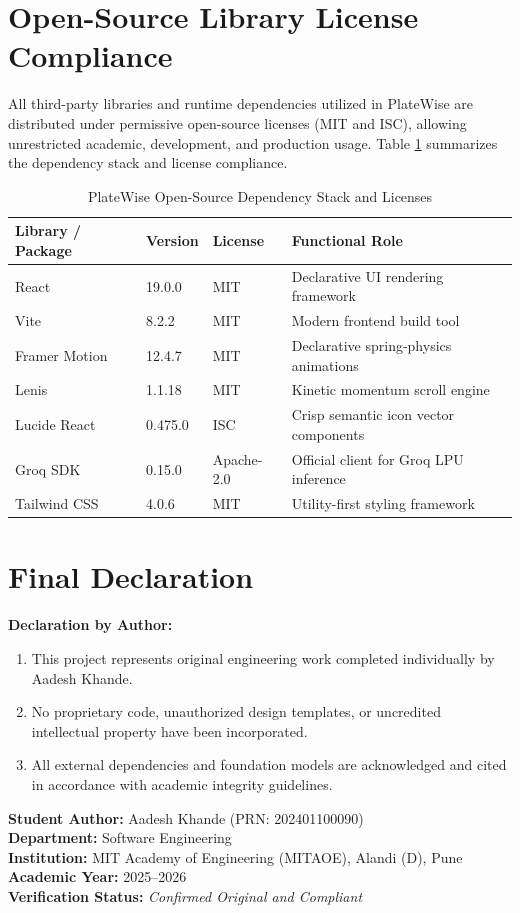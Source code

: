 \section{Open-Source Library License Compliance}
All third-party libraries and runtime dependencies utilized in PlateWise are distributed under permissive open-source licenses (MIT and ISC), allowing unrestricted academic, development, and production usage. Table \ref{tab:licenses} summarizes the dependency stack and license compliance.

\begin{table}[H]
\centering
\caption{PlateWise Open-Source Dependency Stack and Licenses}
\label{tab:licenses}
\begin{tabular}{|p{3.5cm}|p{2.5cm}|p{2.5cm}|p{4.5cm}|}
\hline
\textbf{Library / Package} & \textbf{Version} & \textbf{License} & \textbf{Functional Role} \\ \hline
React & 19.0.0 & MIT & Declarative UI rendering framework \\ \hline
Vite & 8.2.2 & MIT & Modern frontend build tool \\ \hline
Framer Motion & 12.4.7 & MIT & Declarative spring-physics animations \\ \hline
Lenis & 1.1.18 & MIT & Kinetic momentum scroll engine \\ \hline
Lucide React & 0.475.0 & ISC & Crisp semantic icon vector components \\ \hline
Groq SDK & 0.15.0 & Apache-2.0 & Official client for Groq LPU inference \\ \hline
Tailwind CSS & 4.0.6 & MIT & Utility-first styling framework \\ \hline
\end{tabular}
\end{table}

\section{Final Declaration}
\noindent
\textbf{Declaration by Author:}
\begin{enumerate}
    \item This project represents original engineering work completed individually by Aadesh Khande.
    \item No proprietary code, unauthorized design templates, or uncredited intellectual property have been incorporated.
    \item All external dependencies and foundation models are acknowledged and cited in accordance with academic integrity guidelines.
\end{enumerate}

\bigskip
\noindent
\textbf{Student Author:} Aadesh Khande (PRN: 202401100090) \\
\textbf{Department:} Software Engineering \\
\textbf{Institution:} MIT Academy of Engineering (MITAOE), Alandi (D), Pune \\
\textbf{Academic Year:} 2025--2026 \\
\textbf{Verification Status:} \textit{Confirmed Original and Compliant}
